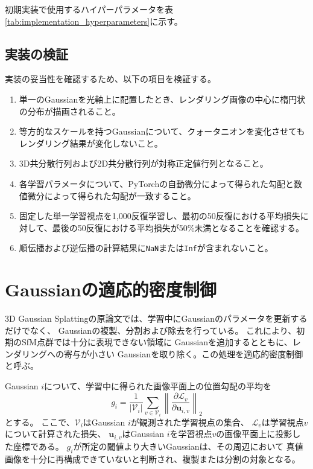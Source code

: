 \documentclass[dvipdfmx]{jlreq}
\begin{document}
初期実装で使用するハイパーパラメータを表\ref{tab:implementation_hyperparameters}に示す。

\subsection{実装の検証}
実装の妥当性を確認するため、以下の項目を検証する。
\begin{enumerate}
    \item 単一のGaussianを光軸上に配置したとき、レンダリング画像の中心に楕円状の分布が描画されること。
    \item 等方的なスケールを持つGaussianについて、クォータニオンを変化させてもレンダリング結果が変化しないこと。
    \item 3D共分散行列および2D共分散行列が対称正定値行列となること。
    \item 各学習パラメータについて、PyTorchの自動微分によって得られた勾配と数値微分によって得られた勾配が一致すること。
    \item 固定した単一学習視点を1,000反復学習し、最初の50反復における平均損失に対して、最後の50反復における平均損失が50\%未満となることを確認する。
    \item 順伝播および逆伝播の計算結果に\texttt{NaN}または\texttt{Inf}が含まれないこと。
\end{enumerate}



\section{Gaussianの適応的密度制御}
3D Gaussian Splattingの原論文では、学習中にGaussianのパラメータを更新するだけでなく、
Gaussianの複製、分割および除去を行っている。
これにより、初期のSfM点群では十分に表現できない領域に
Gaussianを追加するとともに、レンダリングへの寄与が小さい
Gaussianを取り除く。この処理を適応的密度制御と呼ぶ。

Gaussian $i$について、学習中に得られた画像平面上の位置勾配の平均を
\begin{equation}
    g_i
    = \frac{1}{|\mathcal{V}_i|}
    \sum_{v\in\mathcal{V}_i}
    \left\lVert
        \frac{\partial\mathcal{L}_v}{\partial\bm{u}_{i,v}}
    \right\rVert_2
\end{equation}
とする。
ここで、$\mathcal{V}_i$はGaussian $i$が観測された学習視点の集合、
$\mathcal{L}_v$は学習視点$v$について計算された損失、
$\bm{u}_{i,v}$はGaussian $i$を学習視点$v$の画像平面上に投影した座標である。
$g_i$が所定の閾値より大きいGaussianは、その周辺において
真値画像を十分に再構成できていないと判断され、複製または分割の対象となる。
\end{document}
